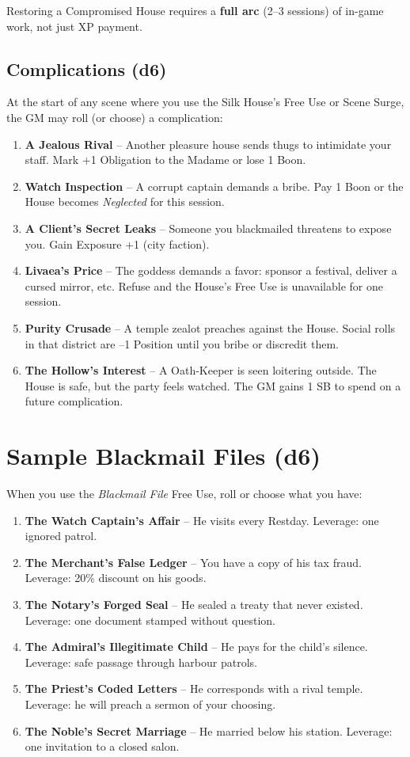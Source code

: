 \documentclass[10pt,twoside]{book}
\begin{document}
Restoring a Compromised House requires a \textbf{full arc} (2--3 sessions) of in-game work, not just XP payment.

\subsection{Complications (d6)}

At the start of any scene where you use the Silk House's Free Use or Scene Surge, the GM may roll (or choose) a complication:

\begin{enumerate}
  \item \textbf{A Jealous Rival} -- Another pleasure house sends thugs to intimidate your staff. Mark +1 Obligation to the Madame or lose 1 Boon.
  \item \textbf{Watch Inspection} -- A corrupt captain demands a bribe. Pay 1 Boon or the House becomes \textit{Neglected} for this session.
  \item \textbf{A Client's Secret Leaks} -- Someone you blackmailed threatens to expose you. Gain Exposure +1 (city faction).
  \item \textbf{Livaea's Price} -- The goddess demands a favor: sponsor a festival, deliver a cursed mirror, etc. Refuse and the House's Free Use is unavailable for one session.
  \item \textbf{Purity Crusade} -- A temple zealot preaches against the House. Social rolls in that district are --1 Position until you bribe or discredit them.
  \item \textbf{The Hollow's Interest} -- A Oath-Keeper is seen loitering outside. The House is safe, but the party feels watched. The GM gains 1 SB to spend on a future complication.
\end{enumerate}

\section{Sample Blackmail Files (d6)}

When you use the \textit{Blackmail File} Free Use, roll or choose what you have:

\begin{enumerate}
  \item \textbf{The Watch Captain's Affair} -- He visits every Restday. Leverage: one ignored patrol.
  \item \textbf{The Merchant's False Ledger} -- You have a copy of his tax fraud. Leverage: 20\% discount on his goods.
  \item \textbf{The Notary's Forged Seal} -- He sealed a treaty that never existed. Leverage: one document stamped without question.
  \item \textbf{The Admiral's Illegitimate Child} -- He pays for the child's silence. Leverage: safe passage through harbour patrols.
  \item \textbf{The Priest's Coded Letters} -- He corresponds with a rival temple. Leverage: he will preach a sermon of your choosing.
  \item \textbf{The Noble's Secret Marriage} -- He married below his station. Leverage: one invitation to a closed salon.
\end{enumerate}
\end{document}
